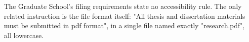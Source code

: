 
%
	{The Graduate School's filing requirements state no accessibility rule. The
	 only related instruction is the file format itself: "All thesis and
	 dissertation materials must be submitted in pdf format", in a single file
	 named exactly "research.pdf", all lowercase.}

